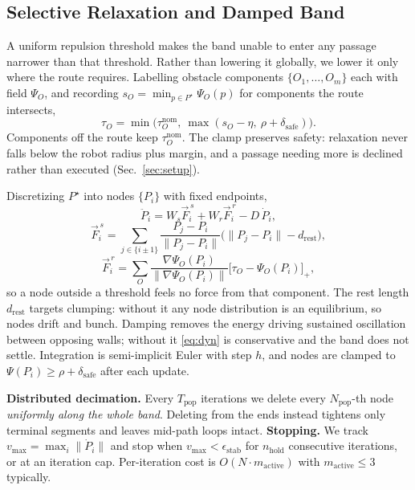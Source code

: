 \documentclass[conference]{IEEEtran}
\begin{document}
\subsection{Selective Relaxation and Damped Band}

A uniform repulsion threshold makes the band unable to enter any passage narrower than that threshold. Rather than lowering it globally, we lower it only where the route requires. Labelling obstacle components $\{O_1,\dots,O_m\}$ each with field $\Psi_O$, and recording $s_O=\min_{p\in P^\star}\Psi_O(p)$ for components the route intersects,
\begin{equation}
\tau_O=\min\big(\tau_O^{\mathrm{nom}},\ \max(s_O-\eta,\ \rho+\delta_{\mathrm{safe}})\big).
\label{eq:relax}
\end{equation}
Components off the route keep $\tau_O^{\mathrm{nom}}$. The clamp preserves safety: relaxation never falls below the robot radius plus margin, and a passage needing more is declined rather than executed (Sec.~\ref{sec:setup}).

Discretizing $P^\star$ into nodes $\{P_i\}$ with fixed endpoints,
\begin{equation}
\ddot{P}_i = W_s \vec{F}^{\,s}_i + W_r \vec{F}^{\,r}_i - D\,\dot{P}_i ,
\label{eq:dyn}
\end{equation}
\begin{equation}
\vec{F}^{\,s}_i=\!\!\sum_{j\in\{i\pm1\}}\!\!\frac{P_j-P_i}{\|P_j-P_i\|}\big(\|P_j-P_i\|-d_{\mathrm{rest}}\big),
\end{equation}
\begin{equation}
\vec{F}^{\,r}_i=\sum_{O} \frac{\nabla\Psi_O(P_i)}{\|\nabla\Psi_O(P_i)\|}\big[\tau_O-\Psi_O(P_i)\big]_+ ,
\end{equation}
so a node outside a threshold feels no force from that component. The rest length $d_{\mathrm{rest}}$ targets clumping: without it any node distribution is an equilibrium, so nodes drift and bunch. Damping removes the energy driving sustained oscillation between opposing walls; without it \eqref{eq:dyn} is conservative and the band does not settle. Integration is semi-implicit Euler with step $h$, and nodes are clamped to $\Psi(P_i)\ge\rho+\delta_{\mathrm{safe}}$ after each update.

\textbf{Distributed decimation.} Every $T_{\mathrm{pop}}$ iterations we delete every $N_{\mathrm{pop}}$-th node \emph{uniformly along the whole band}. Deleting from the ends instead tightens only terminal segments and leaves mid-path loops intact. \textbf{Stopping.} We track $v_{\max}=\max_i\|\dot{P}_i\|$ and stop when $v_{\max}<\epsilon_{\mathrm{stab}}$ for $n_{\mathrm{hold}}$ consecutive iterations, or at an iteration cap. Per-iteration cost is $O(N\cdot m_{\mathrm{active}})$ with $m_{\mathrm{active}}\le 3$ typically.
\end{document}
